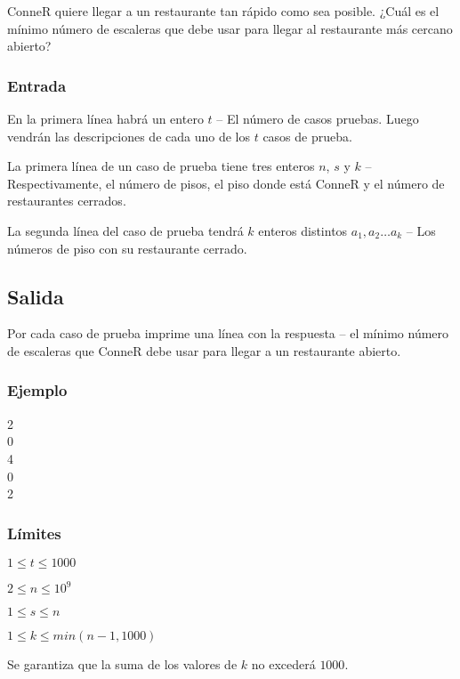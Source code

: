 ConneR quiere llegar a un restaurante tan rápido como sea posible. ¿Cuál es el mínimo número de escaleras que debe usar para llegar al restaurante más cercano abierto?

\subsubsection*{Entrada}
En la primera línea habrá un entero \(t\) -- El número de casos pruebas. Luego vendrán las descripciones de cada uno de los \(t\) casos de prueba.

La primera línea de un caso de prueba tiene tres enteros \(n\), \(s\) y \(k\) -- Respectivamente, el número de pisos, el piso donde está ConneR y el número de restaurantes cerrados.

La segunda línea del caso de prueba tendrá \(k\) enteros distintos \(a_1, a_2 \ldots a_k\) -- Los números de piso con su restaurante cerrado.
\subsection*{Salida}

Por cada caso de prueba imprime una línea con la respuesta -- el mínimo número de escaleras que ConneR debe usar para llegar a un restaurante abierto.

\subsubsection*{Ejemplo}

\begin{casebox2}
	 {
		2\\
		0\\
		4\\
		0\\
		2
	}
\end{casebox2}
\subsubsection*{Límites}
\begin{plimits}
	\item\( 1 \leq t \leq 1000\)
	\item \(2\leq n \leq 10^9\)
	\item \(1\leq s \leq n\)
	\item \(1\leq k \leq min(n-1, 1000)\)
	\item Se garantiza que la suma de los valores de \(k\) no excederá \(1000\).
\end{plimits}

